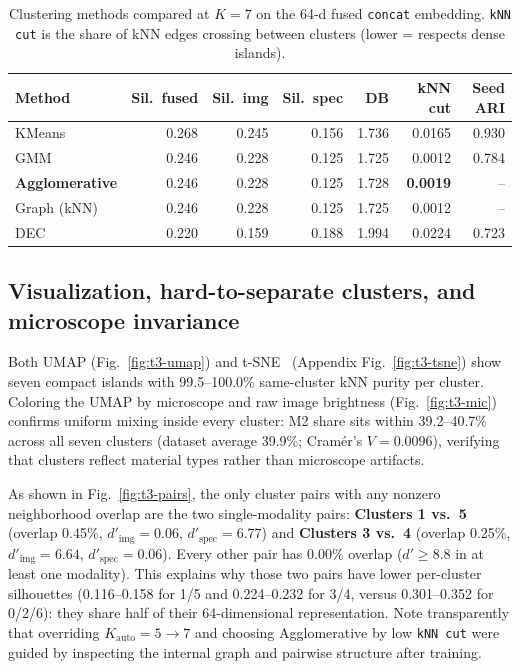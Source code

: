 \begin{table}[t]
  \centering
  \caption{Clustering methods compared at $K = 7$ on the 64-d fused \texttt{concat} embedding.
  \texttt{kNN cut} is the share of kNN edges crossing between clusters (lower = respects dense
  islands).}
  \label{tab:t3-methods}
  \small
  \begin{tabular}{lrrrrrr}
    \toprule
    Method & Sil.\ fused & Sil.\ img & Sil.\ spec & DB & kNN cut & Seed ARI \\
    \midrule
    KMeans                 & 0.268 & 0.245 & 0.156 & 1.736 & 0.0165 & 0.930 \\
    GMM                    & 0.246 & 0.228 & 0.125 & 1.725 & 0.0012 & 0.784 \\
    \textbf{Agglomerative} & 0.246 & 0.228 & 0.125 & 1.728 & \textbf{0.0019} & --    \\
    Graph (kNN)            & 0.246 & 0.228 & 0.125 & 1.725 & 0.0012 & --    \\
    DEC~\cite{xie2016dec}  & 0.220 & 0.159 & 0.188 & 1.994 & 0.0224 & 0.723 \\
    \bottomrule
  \end{tabular}
\end{table}

\subsection{Visualization, hard-to-separate clusters, and microscope invariance}
\label{sec:t3-analysis}

Both UMAP (Fig.~\ref{fig:t3-umap}) and t-SNE~\cite{vandermaaten2008tsne} (Appendix
Fig.~\ref{fig:t3-tsne}) show seven compact islands with 99.5--100.0\% same-cluster kNN purity per
cluster. Coloring the UMAP by microscope and raw image brightness (Fig.~\ref{fig:t3-mic}) confirms
uniform mixing inside every cluster: M2 share sits within 39.2--40.7\% across all seven clusters
(dataset average 39.9\%; Cram\'er's $V = 0.0096$), verifying that clusters reflect material types
rather than microscope artifacts.

As shown in Fig.~\ref{fig:t3-pairs}, the only cluster pairs with any nonzero neighborhood overlap
are the two single-modality pairs: \textbf{Clusters 1 vs.\ 5} (overlap 0.45\%, $d'_{\text{img}} =
0.06$, $d'_{\text{spec}} = 6.77$) and \textbf{Clusters 3 vs.\ 4} (overlap 0.25\%, $d'_{\text{img}}
= 6.64$, $d'_{\text{spec}} = 0.06$). Every other pair has 0.00\% overlap ($d' \ge 8.8$ in at least
one modality). This explains why those two pairs have lower per-cluster silhouettes (0.116--0.158
for 1/5 and 0.224--0.232 for 3/4, versus 0.301--0.352 for 0/2/6): they share half of their
64-dimensional representation. Note transparently that overriding $K_{\text{auto}}=5 \to 7$ and
choosing Agglomerative by low \texttt{kNN cut} were guided by inspecting the internal graph and
pairwise structure after training.

